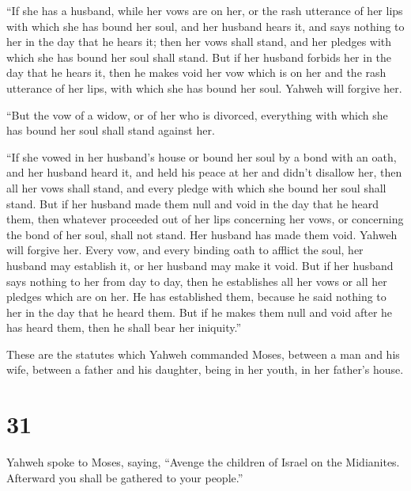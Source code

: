  ``If she has a husband, while her vows are on her, or the
rash utterance of her lips with which she has bound her soul,
 and her husband hears it, and says nothing to her in the
day that he hears it; then her vows shall stand, and her pledges with
which she has bound her soul shall stand.  But if her
husband forbids her in the day that he hears it, then he makes void her
vow which is on her and the rash utterance of her lips, with which she
has bound her soul. Yahweh will forgive her.

 ``But the vow of a widow, or of her who is divorced,
everything with which she has bound her soul shall stand against her.

 ``If she vowed in her husband's house or bound her soul
by a bond with an oath,  and her husband heard it, and
held his peace at her and didn't disallow her, then all her vows shall
stand, and every pledge with which she bound her soul shall stand.
 But if her husband made them null and void in the day
that he heard them, then whatever proceeded out of her lips concerning
her vows, or concerning the bond of her soul, shall not stand. Her
husband has made them void. Yahweh will forgive her. 
Every vow, and every binding oath to afflict the soul, her husband may
establish it, or her husband may make it void.  But if
her husband says nothing to her from day to day, then he establishes all
her vows or all her pledges which are on her. He has established them,
because he said nothing to her in the day that he heard them.
 But if he makes them null and void after he has heard
them, then he shall bear her iniquity.''

 These are the statutes which Yahweh commanded Moses,
between a man and his wife, between a father and his daughter, being in
her youth, in her father's house.

\hypertarget{section-30}{%
\section{31}\label{section-30}}

 Yahweh spoke to Moses, saying,  ``Avenge
the children of Israel on the Midianites. Afterward you shall be
gathered to your people.''

